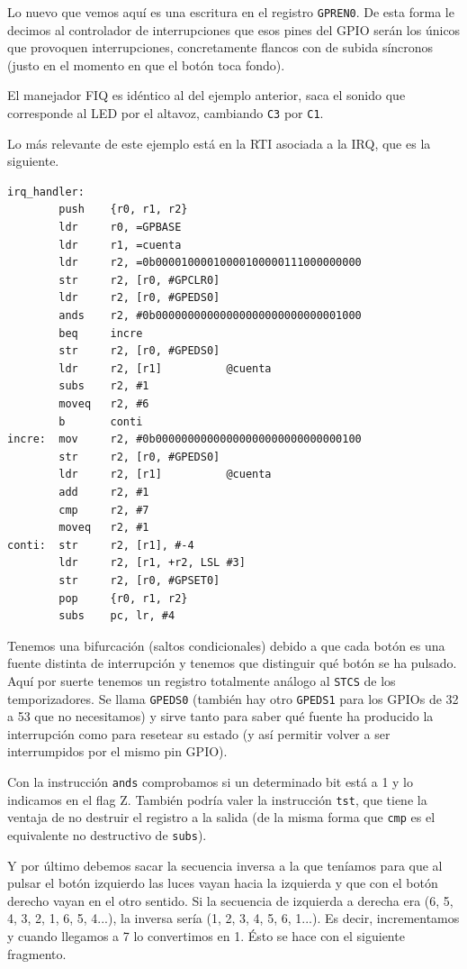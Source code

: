 Lo nuevo que vemos aquí es una escritura en el registro {\tt GPREN0}. De esta forma
le decimos al controlador de interrupciones que esos pines del GPIO serán los únicos que
provoquen interrupciones, concretamente flancos con de subida síncronos (justo
en el momento en que el botón toca fondo).

El manejador FIQ es idéntico al del ejemplo anterior, saca el sonido que corresponde al LED
por el altavoz, cambiando {\tt C3} por {\tt C1}.

Lo más relevante de este ejemplo está en la RTI asociada a la IRQ, que es la siguiente.

\begin{lstlisting}
irq_handler:
        push    {r0, r1, r2}
        ldr     r0, =GPBASE
        ldr     r1, =cuenta
        ldr     r2, =0b00001000010000100000111000000000
        str     r2, [r0, #GPCLR0]
        ldr     r2, [r0, #GPEDS0]
        ands    r2, #0b00000000000000000000000000001000
        beq     incre
        str     r2, [r0, #GPEDS0]
        ldr     r2, [r1]          @cuenta
        subs    r2, #1
        moveq   r2, #6
        b       conti
incre:  mov     r2, #0b00000000000000000000000000000100
        str     r2, [r0, #GPEDS0]
        ldr     r2, [r1]          @cuenta
        add     r2, #1
        cmp     r2, #7
        moveq   r2, #1
conti:  str     r2, [r1], #-4
        ldr     r2, [r1, +r2, LSL #3]
        str     r2, [r0, #GPSET0]
        pop     {r0, r1, r2}
        subs    pc, lr, #4
\end{lstlisting}

Tenemos una bifurcación (saltos condicionales) debido a que cada botón es una fuente distinta
de interrupción y tenemos que distinguir qué botón se ha pulsado. Aquí por suerte tenemos
un registro totalmente análogo al {\tt STCS} de los temporizadores. Se llama {\tt GPEDS0}
(también hay otro {\tt GPEDS1} para los GPIOs de 32 a 53 que no necesitamos) y sirve tanto
para saber qué fuente ha producido la interrupción como para resetear su estado (y así permitir
volver a ser interrumpidos por el mismo pin GPIO).

Con la instrucción {\tt ands} comprobamos si un determinado bit está a 1 y lo indicamos en el
flag Z. También podría valer la instrucción {\tt tst}, que tiene la ventaja de no destruir
el registro a la salida (de la misma forma que {\tt cmp} es el equivalente no destructivo de
{\tt subs}).

Y por último debemos sacar la secuencia inversa a la que teníamos para que al pulsar el
botón izquierdo las luces vayan hacia la izquierda y que con el botón derecho vayan en el otro
sentido. Si la secuencia de izquierda a derecha era  (6, 5, 4, 3, 2, 1, 6, 5, 4...), la
inversa sería (1, 2, 3, 4, 5, 6, 1...). Es decir, incrementamos y cuando llegamos a 7
lo convertimos en 1. Ésto se hace con el siguiente fragmento.

